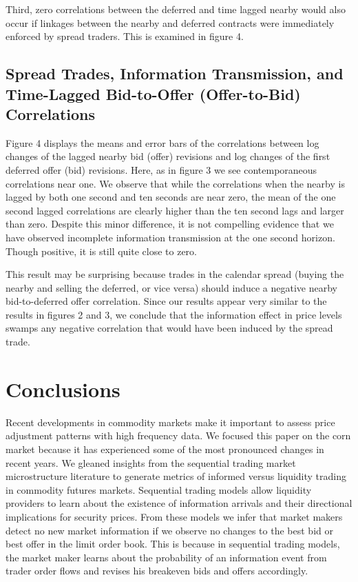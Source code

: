 \documentclass[]{elsarticle} %
\begin{document}
Third, zero correlations between the deferred and time lagged nearby
would also occur if linkages between the nearby and deferred contracts
were immediately enforced by spread traders. This is examined in figure
4.

\subsection{Spread Trades, Information Transmission, and Time-Lagged
Bid-to-Offer (Offer-to-Bid)
Correlations}\label{spread-trades-information-transmission-and-time-lagged-bid-to-offer-offer-to-bid-correlations-1}

Figure 4 displays the means and error bars of the correlations between
log changes of the lagged nearby bid (offer) revisions and log changes
of the first deferred offer (bid) revisions. Here, as in figure 3 we see
contemporaneous correlations near one. We observe that while the
correlations when the nearby is lagged by both one second and ten
seconds are near zero, the mean of the one second lagged correlations
are clearly higher than the ten second lags and larger than zero.
Despite this minor difference, it is not compelling evidence that we
have observed incomplete information transmission at the one second
horizon. Though positive, it is still quite close to zero.

This result may be surprising because trades in the calendar spread
(buying the nearby and selling the deferred, or vice versa) should
induce a negative nearby bid-to-deferred offer correlation. Since our
results appear very similar to the results in figures 2 and 3, we
conclude that the information effect in price levels swamps any negative
correlation that would have been induced by the spread trade.

\section{Conclusions}\label{conclusions}

Recent developments in commodity markets make it important to assess
price adjustment patterns with high frequency data. We focused this
paper on the corn market because it has experienced some of the most
pronounced changes in recent years. We gleaned insights from the
sequential trading market microstructure literature to generate metrics
of informed versus liquidity trading in commodity futures markets.
Sequential trading models allow liquidity providers to learn about the
existence of information arrivals and their directional implications for
security prices. From these models we infer that market makers detect no
new market information if we observe no changes to the best bid or best
offer in the limit order book. This is because in sequential trading
models, the market maker learns about the probability of an information
event from trader order flows and revises his breakeven bids and offers
accordingly.
\end{document}

